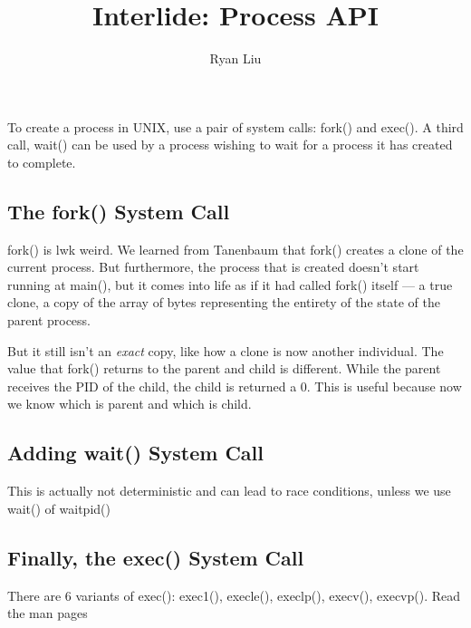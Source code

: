 \documentclass{article}
\title{Interlide: Process API}
\author{Ryan Liu}
\begin{document}
\maketitle
\thispagestyle{empty}
\newpage
{}

\setcounter{section}{4}
\section*{}

To create a process in UNIX, use a pair of system calls: \textsf{fork()} and \textsf{exec()}.
A third call, \textsf{wait()} can be used by a process wishing to wait for a process it has created to complete.

\subsection{The \textsf{fork()} System Call}

\textsf{fork()} is lwk weird.
We learned from Tanenbaum that \textsf{fork()} creates a clone of the current process.
But furthermore, the process that is created doesn't start running at \textsf{main()}, but it comes into life as if it had called \textsf{fork()} itself --- a true clone, a copy of the array of bytes representing the entirety of the state of the parent process.

But it still isn't an \textit{exact} copy, like how a clone is now another individual.
The value that \textsf{fork()} returns to the parent and child is different.
While the parent receives the PID of the child, the child is returned a 0.
This is useful because now we know which is parent and which is child.

\subsection{Adding \textsf{wait()} System Call}

This is actually not deterministic and can lead to race conditions, unless we use \textsf{wait()} of \textsf{waitpid()}

\subsection{Finally, the \textsf{exec()} System Call}

There are 6 variants of \textsf{exec()}: \textsf{exec1(), execle(), execlp(), execv(), execvp()}.
Read the man pages
\end{document}
